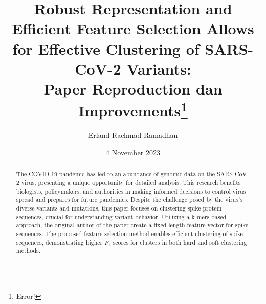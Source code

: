\documentclass[%
 aip,
 jmp,%
 amsmath,amssymb,
 reprint,%
]{revtex4-2}
\begin{document}

\title[Midterm Project]
{Robust Representation and Efficient Feature
Selection Allows for Effective Clustering of SARS-CoV-2
Variants:\\
Paper Reproduction dan Improvements\footnote{Error!}}%

\author{Erland Rachmad Ramadhan}
%


\date{4 November 2023}%

\begin{abstract}
    The COVID-19 pandemic has led to an abundance of genomic data on the SARS-CoV-2 virus,
    presenting a unique opportunity for detailed analysis. This research benefits biologists,
    policymakers, and authorities in making informed decisions to control virus spread and
    prepares for future pandemics. Despite the challenge posed by the virus's diverse variants
    and mutations, this paper focuses on clustering spike protein sequences, crucial for
    understanding variant behavior. Utilizing a k-mers based approach, the original author of the paper
    create a fixed-length feature vector for spike sequences. The proposed feature selection
    method enables efficient clustering of spike sequences, demonstrating higher $F_1$ scores
    for clusters in both hard and soft clustering methods.
\end{abstract}

\maketitle
\end{document}
